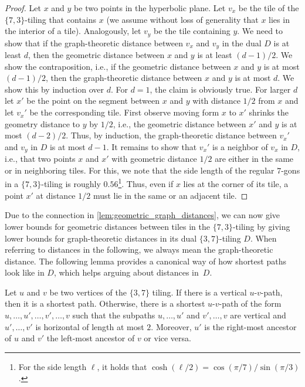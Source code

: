 %
\begin{proof}
    Let $x$ and $y$ be two points in the hyperbolic plane.
    Let $v_x$ be the tile of the $\{7, 3\}$-tiling that contains $x$ (we assume without loss of generality that $x$ lies in the interior of a tile).
    Analogously, let $v_y$ be the tile containing $y$.
    We need to show that if the graph-theoretic distance between $v_x$ and $v_y$ in the dual $D$ is at least $d$, then the geometric distance between $x$ and $y$ is at least $(d - 1) / 2$.
    We show the contraposition, i.e., if the geometric distance between $x$ and $y$ is at most $(d - 1) / 2$, then the graph-theoretic distance between $x$ and $y$ is at most $d$.
%
    We show this by induction over $d$.
    For $d = 1$, the claim is obviously true.
    For larger $d$ let $x'$ be the point on the segment between $x$ and $y$ with distance $1/2$ from $x$ and let $v_x'$ be the corresponding tile.
    First observe moving form $x$ to $x'$ shrinks the geometry distance to $y$ by $1/2$, i.e., the geometric distance between $x'$ and $y$ is at most $(d - 2) / 2$.
    Thus, by induction, the graph-theoretic distance between $v_x'$ and $v_y$ in $D$ is at most $d - 1$.
    It remains to show that $v_x'$ is a neighbor of $v_x$ in $D$, i.e., that two points $x$ and $x'$ with geometric distance $1/2$ are either in the same or in neighboring tiles.
    For this, we note that the side length of the regular $7$-gons in a $\{7, 3\}$-tiling is roughly $0.56$\footnote{For the side length $\ell$, it holds that $\cosh(\ell / 2) = \cos(\pi / 7) / \sin(\pi / 3)$.}.
    Thus, even if $x$ lies at the corner of its tile, a point $x'$ at distance $1/2$ must lie in the same or an adjacent tile.
\end{proof}
%
Due to the connection in \cref{lem:geometric_graph_distances}, we can now give lower bounds for geometric distances between tiles in the $\{7, 3\}$-tiling by giving lower bounds for graph-theoretic distances in its dual $\{3, 7\}$-tiling $D$.
When referring to distances in the following, we always mean the graph-theoretic distance.
The following lemma provides a canonical way of how shortest paths look like in $D$, which helps arguing about distances in~$D$.
%
\begin{lemma}
    \label{lem:3_7_tiling_shorest_paths}
    Let $u$ and $v$ be two vertices of the $\{3, 7\}$ tiling.
    If there is a vertical $u$-$v$-path, then it is a shortest path.
    Otherwise, there is a shortest $u$-$v$-path of the form $u, \dots, u', \dots, v', \dots, v$ such that the subpaths $u, \dots, u'$ and $v', \dots, v$ are vertical and $u', \dots, v'$ is horizontal of length at most $2$.
    Moreover, $u'$ is the right-most ancestor of $u$ and $v'$ the left-most ancestor of $v$ or vice versa.
\end{lemma}
